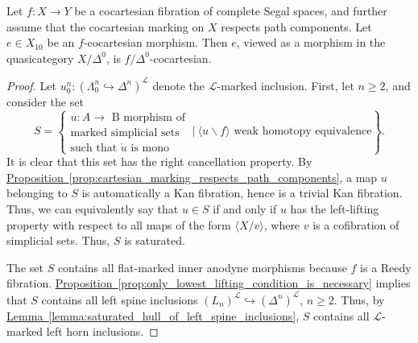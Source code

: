 \documentclass[main.tex]{subfiles}
\begin{document}
\begin{proposition}
  \label{prop:segal_cocartesian_morphisms_are_quasicategory_cocartesian}
  Let $f\colon X \to Y$ be a cocartesian fibration of complete Segal spaces, and further assume that the cocartesian marking on $X$ respects path components. Let $e \in X_{10}$ be an $f$-cocartesian morphism. Then $e$, viewed as a morphism in the quasicategory $X / \Delta^{0}$, is $f / \Delta^{0}$-cocartesian.
\end{proposition}
\begin{proof}
  Let $u^{n}_{0}\colon (\Lambda^{n}_{0} \hookrightarrow \Delta^{n})^{\mathcal{L}}$ denote the $\mathcal{L}$-marked inclusion. First, let $n \geq 2$, and consider the set
  \begin{equation*}
    S =
    \left\{
      \substack{
        u\colon A \to \text{ B morphism of} \\
        \text{marked simplicial sets} \\
        \text{such that $\mathring{u}$ is mono}
      }
      \ \bigg| \ 
      \langle u \backslash f \rangle \text{ weak homotopy equivalence}
    \right\}.
  \end{equation*}
  It is clear that this set has the right cancellation property. By \hyperref[prop:cartesian_marking_respects_path_components]{Proposition~\ref*{prop:cartesian_marking_respects_path_components}}, a map $u$ belonging to $S$ is automatically a Kan fibration, hence is a trivial Kan fibration. Thus, we can equivalently say that $u \in S$ if and only if $u$ has the left-lifting property with respect to all maps of the form $\langle X / v \rangle$, where $v$ is a cofibration of simplicial sets. Thus, $S$ is saturated.

  The set $S$ contains all flat-marked inner anodyne morphisms because $f$ is a Reedy fibration. \hyperref[prop:only_lowest_lifting_condition_is_necessary]{Proposition~\ref*{prop:only_lowest_lifting_condition_is_necessary}} implies that $S$ contains all left spine inclusions $(L_{n})^{\mathcal{L}} \hookrightarrow (\Delta^{n})^{\mathcal{L}}$, $n \geq 2$. Thus, by \hyperref[lemma:saturated_hull_of_left_spine_inclusions]{Lemma~\ref*{lemma:saturated_hull_of_left_spine_inclusions}}, $S$ contains all $\mathcal{L}$-marked left horn inclusions.
\end{proof}
\end{document}
